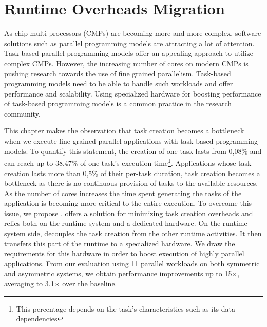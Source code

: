 
\chapter{Runtime Overheads Migration}
\label{chapter.taskgenx}
As chip multi-processors (CMPs) are becoming more and more complex, software solutions such as parallel programming models are attracting a lot of attention.
Task-based parallel programming models offer an appealing approach to utilize complex CMPs.
However, the increasing number of cores on modern CMPs is pushing research towards the use of fine grained parallelism.
Task-based programming models need to be able to handle such workloads and offer performance and scalability.
Using specialized hardware for boosting performance of task-based programming models is a common practice in the research community.

This chapter makes the observation that task creation becomes a bottleneck when we execute fine grained parallel applications with task-based programming models.
To quantify this statement, the creation of one task lasts from 0,08\% and can reach up to 38,47\% of one task's execution time\footnote{This percentage depends on the task's characteristics such as its data dependencies}.
Applications whose task creation lasts more than 0,5\% of their per-task duration, task creation becomes a bottleneck as there is no continuous provision of tasks to the available resources.
%
%
As the number of cores increases the time spent generating the tasks of the application is becoming more critical to the entire execution.
To overcome this issue, we propose {\proposal}.
{\proposal} offers a solution for minimizing task creation overheads and relies both on the runtime system and a dedicated hardware.
On the runtime system side, {\proposal} decouples the task creation from the other runtime activities.
It then transfers this part of the runtime to a specialized hardware.
We draw the requirements for this hardware in order to boost execution of highly parallel applications.
From our evaluation using 11 parallel workloads on both symmetric and asymmetric systems, we obtain performance improvements up to 15$\times$, averaging to 3.1$\times$ over the baseline.
\newpage

